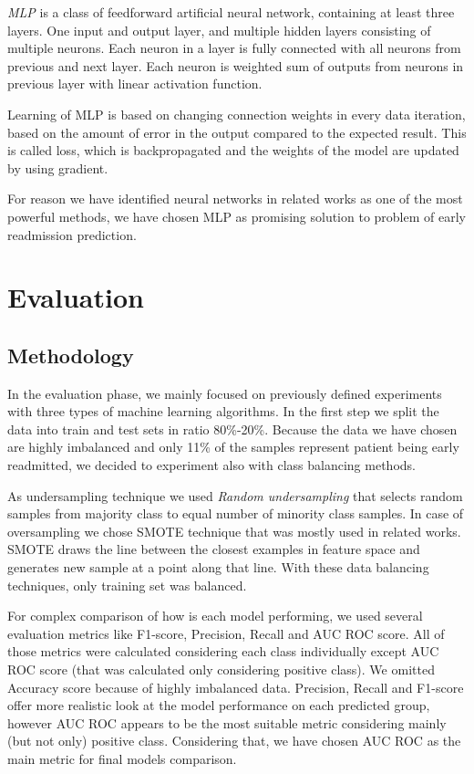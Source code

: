 \documentclass[runningheads]{llncs}
\begin{document}
\emph{MLP} is a class of feedforward artificial neural network, containing at least three layers. One input and output layer, and multiple hidden layers consisting of multiple neurons. Each neuron in a layer is fully connected with all neurons from previous and next layer. Each neuron is weighted sum of outputs from neurons in previous layer with linear activation function.

Learning of MLP is based on changing connection weights in every data iteration, based on the amount of error in the output compared to the expected result. This is called loss, which is backpropagated and the weights of the model are updated by using gradient.

For reason we have identified neural networks in related works as one of the most powerful methods, we have chosen MLP as promising solution to problem of early readmission prediction.


\section{Evaluation}

\subsection{Methodology}
\label{sec:evaluation-methodology}
In the evaluation phase, we mainly focused on previously defined experiments with three types of machine learning algorithms. In the first step we split the data into train and test sets in ratio 80\%-20\%. Because the data we have chosen are highly imbalanced and only 11\% of the samples represent patient being early readmitted, we decided to experiment also with class balancing methods. 

As undersampling technique we used \emph{Random undersampling} that selects random samples from majority class to equal number of minority class samples. In case of oversampling we chose SMOTE technique that was mostly used in related works. SMOTE draws the line between the closest examples in feature space and generates new sample at a point along that line. With these data balancing techniques, only training set was balanced.

For complex comparison of how is each model performing, we used several evaluation metrics like F1-score, Precision, Recall and AUC ROC score. All of those metrics were calculated considering each class individually except AUC ROC score (that was calculated only considering positive class). We omitted Accuracy score because of highly imbalanced data. Precision, Recall and F1-score offer more realistic look at the model performance on each predicted group, however AUC ROC appears to be the most suitable metric considering mainly (but not only) positive class. Considering that, we have chosen AUC ROC as the main metric for final models comparison.
\end{document}
